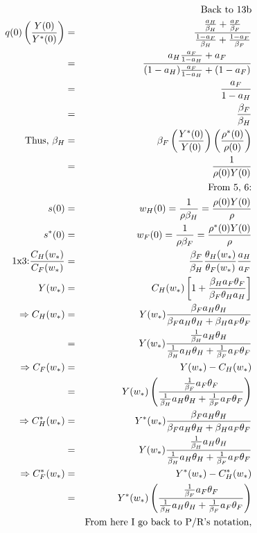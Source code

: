 \documentclass[]{article}
\begin{document}
\begin{eqnarray}
&&\mbox{Back to 13b}\notag\\
q(0)\left(  \frac{Y(0)}{Y^*(0)}\right) &=& \frac{\frac{a_H}{\beta_H}+\frac{a_F}{\beta_F}}{\frac{1-a_F}{\beta_H}+\frac{1-a_F}{\beta_F}}\notag\\
&=& \frac{a_H\frac{a_F}{1-a_H}+a_F}{(1-a_H)\frac{a_F}{1-a_H}+(1-a_F)}\notag\\
&=& \frac{a_F}{1-a_H}\notag\\
&=& \frac{\beta_F}{\beta_H}\notag\\
\mbox{Thus, } \beta_H &=& \beta_F \left(\frac{Y^*(0)}{Y(0)}\right) \left(\frac{\rho^*(0)}{\rho (0)}\right)\notag\\
&=& \frac{1}{\rho(0)Y(0)} \\
&& \mbox{From 5, 6:}\notag\\
s(0) &=& w_H(0) = \frac{1}{\rho \beta_H} = \frac{\rho(0)Y(0)}{\rho}\\
s^*(0) &=& w_F(0) = \frac{1}{\rho \beta_F} = \frac{\rho^*(0)Y(0)}{\rho}\\
\mbox{1x3:} \frac{C_H(w_*)}{C_F(w_*)} &=& \frac{\beta_F}{\beta_H} \frac{\theta_H(w_*)}{\theta_F(w_*)}\frac{a_H}{a_F}\notag\\
Y(w_*) &=& C_H(w_*)\left[1+\frac{\beta_H a_F \theta_F}{\beta_F \theta_H a_H}\right]\notag\\
\Rightarrow C_H(w_*) &=& Y(w_*) \frac{\beta_F a_H \theta_H}{\beta_F a_H \theta_H + \beta_H a_F \theta_F}\notag\\
&=& Y(w_*) \frac{\frac{1}{\beta_H}a_H\theta_H}{\frac{1}{\beta_H}a_H\theta_H + \frac{1}{\beta_F}a_F \theta_F}\\
\Rightarrow C_F(w_*) &=& Y(w_*) - C_H(w_*)\notag\\
&=& Y(w_*) \left(\frac{\frac{1}{\beta_F}a_F\theta_F}{\frac{1}{\beta_H}a_H\theta_H+\frac{1}{\beta_F}a_F\theta_F}\right)\\
\Rightarrow C_H^*(w_*) &=& Y^*(w_*) \frac{\beta_F a_H \theta_H}{\beta_F a_H \theta_H + \beta_H a_F \theta_F}\notag\\
&=& Y(w_*) \frac{\frac{1}{\beta_H}a_H\theta_H}{\frac{1}{\beta_H}a_H\theta_H + \frac{1}{\beta_F}a_F \theta_F}\notag \\
\Rightarrow C_F^*(w_*) &=& Y^*(w_*) - C_H^*(w_*)\notag\\
&=& Y^*(w_*) \left(\frac{\frac{1}{\beta_F}a_F\theta_F}{\frac{1}{\beta_H}a_H\theta_H+\frac{1}{\beta_F}a_F\theta_F}\right)\notag\\
&& \mbox{From here I go back to P/R's notation,}\notag\\

\end{eqnarray}
\end{document}

